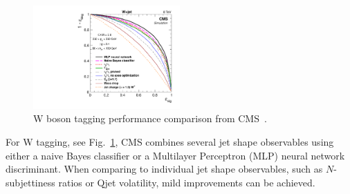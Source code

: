 \begin{figure}
  \includegraphics[width=0.5\textwidth]{figures/cms_W_roc.pdf}\hfill%
  \begin{minipage}[b]{0.42\textwidth}
    \caption{W boson tagging performance comparison from CMS~\cite{Khachatryan:2014vla}. 
  }\label{fig:cms_w_tag}
    \vspace*{2.4cm}
  \end{minipage}\hspace*{0.3cm}
\end{figure}
%
For W tagging, see Fig.~\ref{fig:cms_w_tag}, CMS combines several jet shape observables using either a naive Bayes classifier or a Multilayer Perceptron (MLP) neural network discriminant. When comparing to individual jet shape observables, such as $N$-subjettiness ratios or Qjet volatility, mild improvements can be achieved.  



